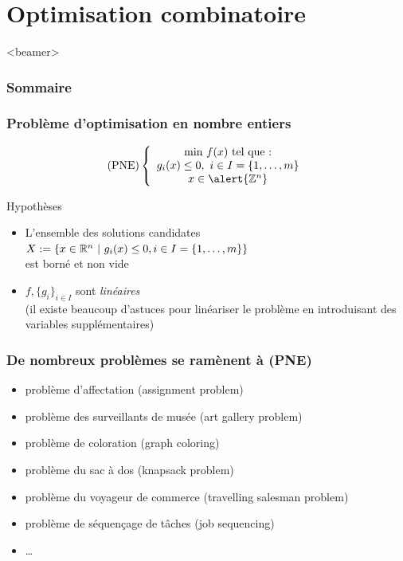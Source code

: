 \documentclass{beamer}
\newcommand{\Z}{{\ensuremath\mathbb{Z}}}
\newcommand{\R}{{\ensuremath\mathbb{R}}}
\begin{document}
\section{Optimisation combinatoire}

\begin{frame}<beamer>
  \frametitle{Sommaire}
  \tableofcontents[currentsection]
\end{frame}

\begin{frame}
  \frametitle{Problème d'optimisation en nombre entiers}
  
  \[
  \text{(PNE)} \left\{
  \begin{array}{c}
    \text{min} \ f(x) \ \text{tel que :} \\
    g_i(x) \leq 0, \ i \in I = \{1, \dots, m\} \\
    x \in \alert{\Z^n}
  \end{array}
  \right.
  \]

  \begin{block}{Hypothèses}
    \begin{itemize}
    \item L'ensemble des solutions candidates
      $X := \{ x \in \R^n \ | \ g_i(x) \leq 0, i \in I = \{1, \dots, m\} \}$ \\
      est borné et non vide
    \item $f, \{g_i\}_{i \in I}$ sont \emph{linéaires} \\
      (il existe beaucoup d'astuces pour
      linéariser le problème en introduisant des variables supplémentaires)
    \end{itemize}
  \end{block}
\end{frame}

\begin{frame}
  \frametitle{De nombreux problèmes se ramènent à (PNE)}

  \begin{itemize}
    \item problème d'affectation (assignment problem)
    \item problème des surveillants de musée (art gallery problem)
    \item problème de coloration (graph coloring)
    \item problème du sac à dos (knapsack problem)
    \item problème du voyageur de commerce (travelling salesman problem)
    \item problème de séquençage de tâches (job sequencing)
    \item \dots
  \end{itemize}
  
\end{frame}
\end{document}

